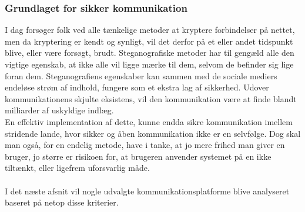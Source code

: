 \subsubsection{Grundlaget for sikker kommunikation}
I dag forsøger folk ved alle tænkelige metoder at kryptere forbindelser på nettet, men da kryptering er kendt og synligt, vil det derfor på et eller andet tidspunkt blive, eller være forsøgt, brudt. Steganografiske metoder har til gengæld alle den vigtige egenskab, at ikke alle vil ligge mærke til dem, selvom de befinder sig lige foran dem. Steganografiens egenskaber kan sammen med de sociale mediers endeløse strøm af indhold, fungere som et ekstra lag af sikkerhed. Udover kommunikationens skjulte eksistens, vil den kommunikation være at finde blandt milliarder af uskyldige indlæg.\\
En effektiv implementation af dette, kunne endda sikre kommunikation imellem stridende lande, hvor sikker og åben kommunikation ikke er en selvfølge.
Dog skal man også, for en endelig metode, have i tanke, at jo mere frihed man giver en bruger, jo større er risikoen for, at brugeren anvender systemet på en ikke tiltænkt, eller ligefrem uforsvarlig måde.
\\\\
I det næste afsnit vil nogle udvalgte kommunikationsplatforme blive analyseret baseret på netop disse kriterier.